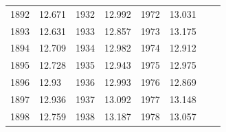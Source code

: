 \begin{description}[noitemsep]
\begin{description}[noitemsep]
\begin{table}[H]
\begin{center}
\begin{xtabular}[t]{|l|l|l|l|l|l|l|l|}
     \tabularnewline{}
        	1892	 &
        	12.671	 &
        	1932	 &
        	12.992	 &
        	1972	 &
        	13.031	 &
        		 &
     \tabularnewline{}
        	1893	 &
        	12.631	 &
        	1933	 &
        	12.857	 &
        	1973	 &
        	13.175	 &
        		 &
     \tabularnewline{}
        	1894	 &
        	12.709	 &
        	1934	 &
        	12.982	 &
        	1974	 &
        	12.912	 &
        		 &
     \tabularnewline{}
        	1895	 &
        	12.728	 &
        	1935	 &
        	12.943	 &
        	1975	 &
        	12.975	 &
        		 &
     \tabularnewline{}
        	1896	 &
        	12.93	 &
        	1936	 &
        	12.993	 &
        	1976	 &
        	12.869	 &
        		 &
     \tabularnewline{}
        	1897	 &
        	12.936	 &
        	1937	 &
        	13.092	 &
        	1977	 &
        	13.148	 &
        		 &
     \tabularnewline{}
        	1898	 &
        	12.759	 &
        	1938	 &
        	13.187	 &
        	1978	 &
        	13.057	 &
        		 &
     \tabularnewline{}

\end{xtabular}
\end{center}
\end{table}
\end{description}
\end{description}
